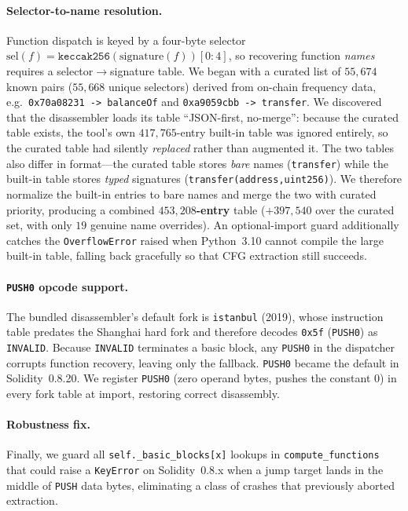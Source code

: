 \documentclass{stylefiles/capstone}
\begin{document}
\paragraph{Selector-to-name resolution.}
Function dispatch is keyed by a four-byte selector
$\mathrm{sel}(f)=\texttt{keccak256}(\text{signature}(f))[0{:}4]$, so recovering
function \emph{names} requires a selector$\rightarrow$signature table. We began
with a curated list of $55{,}674$ known pairs ($55{,}668$ unique selectors)
derived from on-chain frequency data, e.g.\
\verb|0x70a08231 -> balanceOf| and \verb|0xa9059cbb -> transfer|. We discovered
that the disassembler loads its table ``JSON-first, no-merge'': because the
curated table exists, the tool's own $417{,}765$-entry built-in table was ignored
entirely, so the curated table had silently \emph{replaced} rather than augmented
it. The two tables also differ in format—the curated table stores \emph{bare}
names (\texttt{transfer}) while the built-in table stores \emph{typed} signatures
(\texttt{transfer(address,uint256)}). We therefore normalize the built-in entries
to bare names and merge the two with curated priority, producing a combined
\textbf{$453{,}208$-entry} table ($+397{,}540$ over the curated set, with only $19$
genuine name overrides). An optional-import guard additionally catches the
\texttt{OverflowError} raised when Python~3.10 cannot compile the large built-in
table, falling back gracefully so that CFG extraction still succeeds.

\paragraph{\texttt{PUSH0} opcode support.}
The bundled disassembler's default fork is \texttt{istanbul} (2019), whose
instruction table predates the Shanghai hard fork and therefore decodes
\verb|0x5f| (\texttt{PUSH0}) as \texttt{INVALID}. Because \texttt{INVALID}
terminates a basic block, any \texttt{PUSH0} in the dispatcher corrupts function
recovery, leaving only the fallback. \texttt{PUSH0} became the default in
Solidity~0.8.20. We register \texttt{PUSH0} (zero operand bytes, pushes the
constant $0$) in every fork table at import, restoring correct disassembly.

\paragraph{Robustness fix.}
Finally, we guard all \texttt{self.\_basic\_blocks[x]} lookups in
\texttt{compute\_functions} that could raise a \texttt{KeyError} on
Solidity~0.8.x when a jump target lands in the middle of \texttt{PUSH} data bytes,
eliminating a class of crashes that previously aborted extraction.
\end{document}
